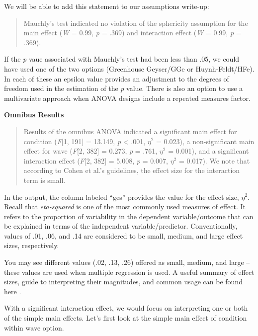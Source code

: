 \documentclass[
  11pt,
]{book}
\begin{document}
We will be able to add this statement to our assumptions write-up:

\begin{quote}
Mauchly's test indicated no violation of the sphericity assumption for the main effect (\emph{W} = 0.99, \emph{p} = .369) and interaction effect (\emph{W} = 0.99, \emph{p} = .369).
\end{quote}

If the \emph{p} vaue associated with Mauchly's test had been less than .05, we could have used one of the two options (Greenhouse Geyser/GGe or Huynh-Feldt/HFe). In each of these an epsilon value provides an adjustment to the degrees of freedom used in the estimation of the \emph{p} value. There is also an option to use a multivariate approach when ANOVA designs include a repeated measures factor.

\textbf{Omnibus Results}

\begin{quote}
Results of the omnibus ANOVA indicated a significant main effect for condition (\emph{F}{[}1, 191{]} = 13.149, \emph{p} \textless{} .001, \(\eta^{2}\) = 0.023), a non-significant main effect for wave (\emph{F}{[}2, 382{]} = 0.273, \emph{p} = .761, \(\eta^{2}\) = 0.001), and a significant interaction effect (\emph{F}{[}2, 382{]} = 5.008, \emph{p} = 0.007, \(\eta^{2}\) = 0.017). We note that according to Cohen et al.'s \citep{cohen_applied_2003} guidelines, the effect size for the interaction term is small.
\end{quote}

In the output, the column labeled ``ges'' provides the value for the effect size, \(\eta^{2}\). Recall that \emph{eta-squared} is one of the most commonly used measures of effect. It refers to the proportion of variability in the dependent variable/outcome that can be explained in terms of the independent variable/predictor. Conventionally, values of .01, .06, and .14 are considered to be small, medium, and large effect sizes, respectively.

You may see different values (.02, .13, .26) offered as small, medium, and large -- these values are used when multiple regression is used. A useful summary of effect sizes, guide to interpreting their magnitudes, and common usage can be found \href{https://imaging.mrc-cbu.cam.ac.uk/statswiki/FAQ/effectSize}{here} \citep{watson_rules_2020}.

With a significant interaction effect, we would focus on interpreting one or both of the simple main effects. Let's first look at the simple main effect of condition within wave option.
\end{document}
